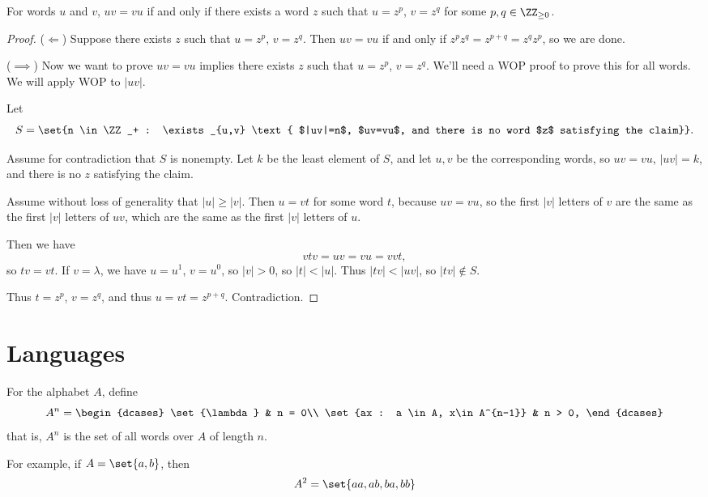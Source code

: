 \documentclass{article}
\theoremstyle{remark}
\begin{document}
\begin{proposition}
    For words $u$ and $v$, $uv=vu$ if and only if there exists a 
    word $z$ such that $u=z^p$, $v=z^q$ for some
    $p,q\in\ZZ_{\ge 0}$.
\end{proposition}

\begin{proof}
    ($\Longleftarrow$)
    Suppose there exists $z$ such that $u=z^p$, $v=z^q$.
    Then $uv=vu$ if and only if $z^pz^q=z^{p+q}=z^qz^p$, so
    we are done.

    ($\implies$) Now we want to prove $uv=vu$ implies 
    there exists $z$ such that $u=z^p$, $v=z^q$. We'll need
    a WOP proof to prove this for all words. We will apply
    WOP to $|uv|$.

    Let 
    \[ S=\set{n \in \ZZ_+ : \exists_{u,v} \text{ $|uv|=n$, $uv=vu$,
    and there is no word $z$
    satisfying the claim}}.\]

    Assume for contradiction that $S$ is nonempty. Let 
    $k$ be the least element of $S$, and let $u,v$ be the
    corresponding words, so $uv=vu$, $|uv|=k$, and 
    there is no $z$ satisfying the claim.

    Assume without loss of generality that $|u|\ge |v|$.
    Then $u=vt$ for some word $t$, because $uv=vu$, so the first
    $|v|$ letters of $v$ are the same as the first $|v|$ letters
    of $uv$, which are the same as the first $|v|$ letters of $u$.

    Then we have \[ vtv = uv = vu = vvt,\] so $tv=vt$. 
    If $v=\lambda$, we have $u=u^1$, $v=u^0$, so $|v| > 0$,
    so $|t|<|u|$. Thus $|tv| < |uv|$, so $|tv| \not\in S$.

    Thus $t=z^p$, $v=z^q$, and thus $u=vt=z^{p+q}$. 
    Contradiction.
\end{proof}

\section{Languages}

\begin{definition}
For the alphabet $A$, define 
\[ A^n = \begin{dcases}
    \set{\lambda } & n = 0\\
    \set{ax : a \in A, x\in A^{n-1}} & n > 0,
    \end{dcases}
    \]
that is, $A^n$ is the set of all words over $A$ of length $n$.

For example, if $A=\set{a,b}$, then 
\[ A^2 = \set{ aa, ab, ba, bb} \]
\end{definition}
\end{document}
